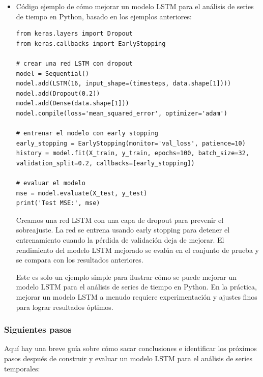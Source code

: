 \documentclass[11pt]{article}
\begin{document}
\begin{itemize}
\item Código
\label{sec:orgea57ded}
ejemplo de cómo  mejorar un modelo LSTM para el  análisis de series de
tiempo en Python, basado en los ejemplos anteriores:
\begin{verbatim}
from keras.layers import Dropout
from keras.callbacks import EarlyStopping

# crear una red LSTM con dropout
model = Sequential()
model.add(LSTM(16, input_shape=(timesteps, data.shape[1])))
model.add(Dropout(0.2))
model.add(Dense(data.shape[1]))
model.compile(loss='mean_squared_error', optimizer='adam')

# entrenar el modelo con early stopping
early_stopping = EarlyStopping(monitor='val_loss', patience=10)
history = model.fit(X_train, y_train, epochs=100, batch_size=32, validation_split=0.2, callbacks=[early_stopping])

# evaluar el modelo
mse = model.evaluate(X_test, y_test)
print('Test MSE:', mse)
\end{verbatim}

Creamos una red LSTM con una capa de dropout para prevenir el
sobreajuste. La red se entrena usando early stopping para detener el
entrenamiento cuando la pérdida de validación deja de mejorar. El
rendimiento del modelo LSTM mejorado se evalúa en el conjunto de
prueba y se compara con los resultados anteriores.

Este es solo un ejemplo simple para ilustrar cómo se puede mejorar un
modelo LSTM para el análisis de series de tiempo en Python. En la
práctica, mejorar un modelo LSTM a menudo requiere experimentación y
ajustes finos para lograr resultados óptimos.
\end{itemize}

\subsubsection{Siguientes pasos}
\label{sec:orgb90102e}
Aquí hay una breve guía sobre cómo sacar conclusiones e identificar
los próximos pasos después de construir y evaluar un modelo LSTM para
el análisis de series temporales:
\end{document}
